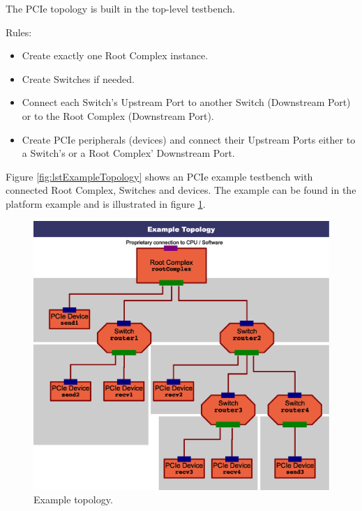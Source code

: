 The PCIe topology is built in the top-level testbench.

Rules:
\begin{itemize}
  \item Create exactly one Root Complex instance.
  \item Create Switches if needed.
  \item Connect each Switch's Upstream Port to another Switch (Downstream Port) or to the Root Complex (Downstream Port).
  \item Create PCIe peripherals (devices) and connect their Upstream Ports either to a Switch's or a Root Complex' Downstream Port.
\end{itemize}

Figure \ref{fig:lstExampleTopology} shows an PCIe example testbench with connected Root Complex, Switches and devices. The example can be found in the platform example  and is illustrated in figure \ref{fig:ExampleTopology}.

\begin{figure}[htb]%
	\centerline{
		\includegraphics[width=15cm]{figures/example_pcie_platform_topology.eps}} 
	\caption{Example topology.}
	\label{fig:ExampleTopology}
\end{figure}

